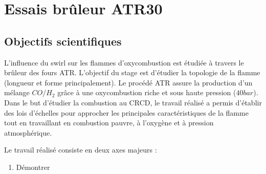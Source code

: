 \chapter[Protocole essais brûleur ATR30 sur Calhory ]%
{Essais brûleur ATR30}
\section{Objectifs scientifiques}

 L'influence du swirl sur les flammes d'oxycombustion est étudiée à travers le brûleur des fours ATR.  L'objectif du stage est d'étudier la topologie de la flamme (longueur et forme principalement). Le procédé ATR assure la production d'un mélange $CO/H_{2}$  grâce à une oxycombustion riche et sous haute pression ($40 bar$). Dans le but d'étudier la combustion au CRCD, le travail réalisé a permis d'établir des lois d'échelles pour approcher les principales caractéristiques de la flamme tout en travaillant en combustion pauvre, à l'oxygène et à pression atmosphérique.
 
 Le travail réalisé consiste en deux axes majeurs :
 \begin{enumerate}
\item Démontrer 
\end{enumerate}